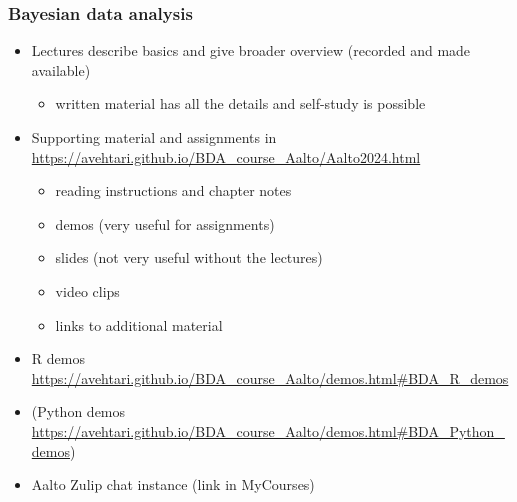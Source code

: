 \documentclass[english,t]{beamer}
\begin{document}
\begin{frame}
  \frametitle{Bayesian data analysis}  %

  \begin{itemize}
  \item Lectures describe basics and give broader overview (recorded
    and made available)
    \begin{itemize}
    \item written material has all the details and self-study
      is possible
    \end{itemize}
  \item Supporting material and assignments in
    {\small\url{https://avehtari.github.io/BDA_course_Aalto/Aalto2024.html}}
    \begin{itemize}
    \item reading instructions and chapter notes
    \item demos (very useful for assignments)
    \item slides (not very useful without the lectures)
    \item video clips
    \item links to additional material
    \end{itemize}
   \item R demos {\small\url{https://avehtari.github.io/BDA_course_Aalto/demos.html\#BDA_R_demos}}
  \item (Python demos {\small\url{https://avehtari.github.io/BDA_course_Aalto/demos.html\#BDA_Python_demos})}
  \item Aalto Zulip chat instance (link in MyCourses)
  \end{itemize}

\end{frame}
\end{document}
